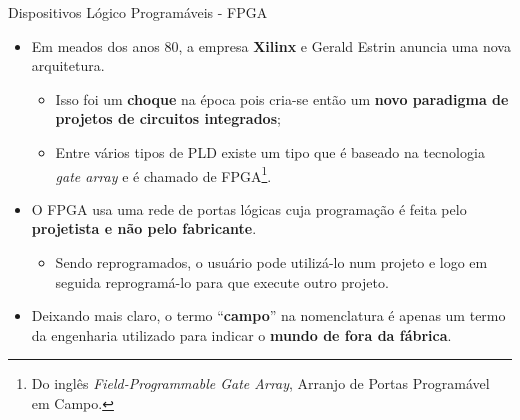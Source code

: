 	\begin{frame}{Dispositivos Lógico Programáveis - FPGA}
		\begin{itemize}
			\setlength\itemsep{1.4em}

			\item Em meados dos anos 80, a empresa \textbf{Xilinx} e Gerald Estrin anuncia uma nova arquitetura.

			\begin{itemize}\setlength\itemsep{0.4em}
				\item Isso foi um \textbf{choque} na época pois cria-se então um \textbf{novo paradigma de projetos de circuitos integrados};

				\item Entre vários tipos de PLD existe um tipo que é baseado na tecnologia \textit{gate array} e é chamado de FPGA\footnote{Do inglês \textit{Field-Programmable Gate Array}, Arranjo de Portas Programável em Campo.}.
			\end{itemize}


			\item O FPGA usa uma rede de portas lógicas cuja programação é feita pelo \textbf{projetista e não pelo fabricante}.
			\begin{itemize}
				\item Sendo reprogramados, o usuário pode utilizá-lo num projeto e logo em seguida reprogramá-lo para que execute outro projeto.
			\end{itemize}

			\item Deixando mais claro, o termo ``\textbf{campo}'' na nomenclatura é apenas um termo da engenharia utilizado para indicar o \textbf{mundo de fora da fábrica}.
		\end{itemize}
	\end{frame}

